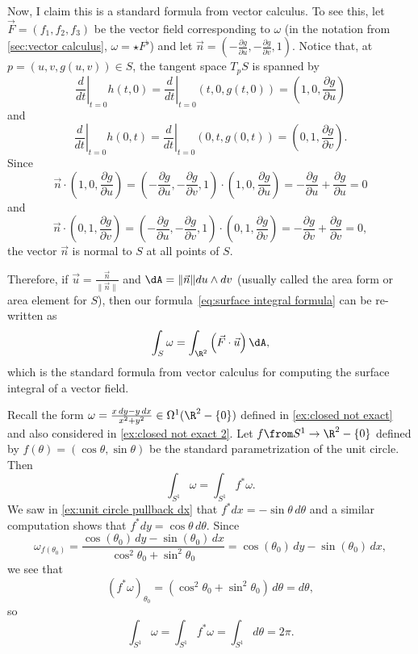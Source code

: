 \begin{example}
	Now, I claim this is a standard formula from vector calculus. To see this, let $\vec{F} = (f_1, f_2, f_3)$ be the vector field corresponding to $\omega$ (in the notation from \cref{sec:vector calculus}, $\omega = \star F^\flat$) and let $\vec{n} = \left( -\frac{\partial g}{\partial u}, -\frac{\partial g}{\partial v}, 1\right)$. Notice that, at $p = (u,v,g(u,v)) \in S$, the tangent space $T_pS$ is spanned by
	\[
		\left. \frac{d}{dt} \right|_{t=0} h(t,0) = \left. \frac{d}{dt} \right|_{t=0} (t,0,g(t,0)) = \left( 1, 0 , \frac{\partial g}{\partial u} \right)
	\]
	and
	\[
		\left. \frac{d}{dt} \right|_{t=0} h(0,t) = \left. \frac{d}{dt} \right|_{t=0} (0,t,g(0,t)) = \left( 0,1 , \frac{\partial g}{\partial v} \right).
	\]
	Since
	\[
		\vec{n} \cdot \left( 1, 0 , \frac{\partial g}{\partial u} \right) = \left( -\frac{\partial g}{\partial u}, -\frac{\partial g}{\partial v}, 1\right) \cdot \left( 1, 0 , \frac{\partial g}{\partial u} \right) = -\frac{\partial g}{\partial u} + \frac{\partial g}{\partial u}  = 0
	\]
	and
	\[
		\vec{n} \cdot \left( 0,1 , \frac{\partial g}{\partial v} \right) = \left( -\frac{\partial g}{\partial u}, -\frac{\partial g}{\partial v}, 1\right) \cdot \left(0,1 , \frac{\partial g}{\partial v} \right) = -\frac{\partial g}{\partial v} + \frac{\partial g}{\partial v}  = 0,
	\]
	the vector $\vec{n}$ is normal to $S$ at all points of $S$. 
	
	Therefore, if $\vec{u} = \frac{\vec{n}}{\|\vec{n}\|}$ and $\dA = \|\vec{n}\| du \wedge dv$ (usually called the area form or area element for $S$), then our formula~\eqref{eq:surface integral formula} can be re-written as
	\[
		\int_S \omega = \int_{\R^2} \left(\vec{F} \cdot \vec{u}\right) \dA,
	\]
	which is the standard formula from vector calculus for computing the surface integral of a vector field.
\end{example}

\begin{example}
	Recall the form $\omega = \frac{x \, dy - y \, dx}{x^2 + y^2} \in \Omega^1(\R^2 -\{0\})$ defined in \cref{ex:closed not exact} and also considered in \cref{ex:closed not exact 2}. Let $f \from S^1 \to \R^2 -\{0\}$ defined by $f(\theta) = (\cos \theta , \sin \theta)$ be the standard parametrization of the unit circle. Then
	\[
		\int_{S^1} \omega = \int_{S^1} f^\ast \omega.
	\]
	We saw in \cref{ex:unit circle pullback dx} that $f^\ast dx = -\sin\theta\, d\theta$ and a similar computation shows that $f^\ast dy = \cos \theta\, d\theta$. Since
	\[
		\omega_{f(\theta_0)} = \frac{\cos(\theta_0) \, dy - \sin(\theta_0) \, dx}{\cos^2 \theta_0 + \sin^2\theta_0} = \cos(\theta_0) \, dy - \sin(\theta_0) \, dx,
	\]
	we see that
	\[
		(f^\ast \omega)_{\theta_0} = (\cos^2\theta_0 + \sin^2\theta_0)\, d\theta = d\theta,
	\]
	so
	\[
		\int_{S^1} \omega = \int_{S^1} f^\ast \omega = \int_{S^1} d\theta = 2\pi.
	\]
\end{example}

